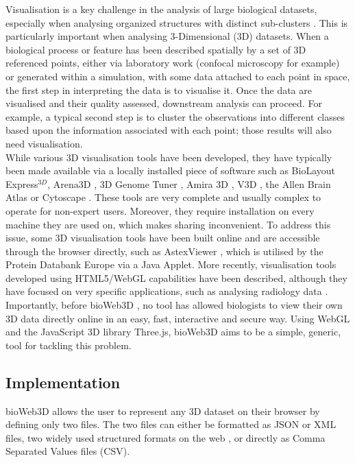Visualisation is a key challenge in the analysis of large biological datasets, especially when analysing organized structures with distinct sub-clusters \cite{Rubel10}. This is particularly important when analysing 3-Dimensional (3D) datasets. When a biological process or feature has been described spatially by a set of 3D referenced points, either via laboratory work (confocal microscopy for example) or generated within a simulation, with some data attached to each point in space, the first step in interpreting the data is to visualise it. Once the data are visualised and their quality assessed, downstream analysis can proceed. For example, a typical second step is to cluster the observations into different classes based upon the information associated with each point; those results will also need visualisation. \\

While various 3D visualisation tools have been developed, they have typically been made available via a locally installed piece of software such as BioLayout Express$^{3D}$\cite{Freeman07}, Arena3D \cite{Pavlopoulos08},  3D Genome Tuner \cite{Wang093D}, Amira 3D \cite{Stalling05}, V3D \cite{Peng10}, the Allen Brain Atlas \cite{Lein07} or Cytoscape \cite{Shannon03}. These tools are very complete and usually complex to operate for non-expert users. Moreover, they require installation on every machine they are used on, which makes sharing inconvenient. To address this issue, some 3D visualisation tools have been built online and are accessible through the browser directly, such as AstexViewer \cite{Hartshorn02}, which is utilised by the Protein Databank Europe via a Java Applet. More recently, visualisation tools developed using HTML5/WebGL capabilities have been described, although they have focused on very specific applications, such as analysing radiology data  \cite{Dinesh12}.\\

Importantly, before bioWeb3D \cite{Pettit13}, no tool has allowed biologists to view their own 3D data directly online in an easy, fast, interactive and secure way. Using WebGL and the JavaScript 3D library Three.js, bioWeb3D aims to be a simple, generic, tool for tackling this problem.\\

	\subsection{Implementation}

bioWeb3D allows the user to represent any 3D dataset on their browser by defining only two files. The two files can either be formatted as JSON or XML files, two widely used structured formats on the web \cite{Wilde07} \cite{xmlref}, or directly as Comma Separated Values files (CSV).\\

